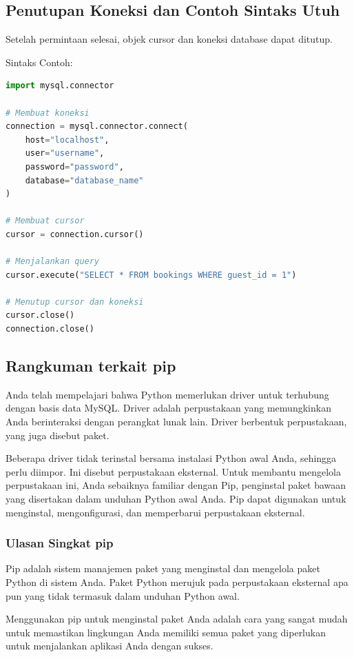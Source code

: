 \documentclass{article}
\begin{document}
\subsection{Penutupan Koneksi dan Contoh Sintaks Utuh}
Setelah permintaan selesai, objek cursor dan koneksi database dapat ditutup.

Sintaks Contoh:
\begin{lstlisting}[language=Python, caption={}, captionpos=b]
import mysql.connector

# Membuat koneksi
connection = mysql.connector.connect(
    host="localhost",
    user="username",
    password="password",
    database="database_name"
)

# Membuat cursor
cursor = connection.cursor()

# Menjalankan query
cursor.execute("SELECT * FROM bookings WHERE guest_id = 1")

# Menutup cursor dan koneksi
cursor.close()
connection.close()
\end{lstlisting}

\subsection{Rangkuman terkait pip}
Anda telah mempelajari bahwa Python memerlukan driver untuk terhubung dengan basis data MySQL. Driver adalah perpustakaan yang memungkinkan Anda berinteraksi dengan perangkat lunak lain. Driver berbentuk perpustakaan, yang juga disebut paket.

Beberapa driver tidak terinstal bersama instalasi Python awal Anda, sehingga perlu diimpor. Ini disebut perpustakaan eksternal. Untuk membantu mengelola perpustakaan ini, Anda sebaiknya familiar dengan Pip, penginstal paket bawaan yang disertakan dalam unduhan Python awal Anda. Pip dapat digunakan untuk menginstal, mengonfigurasi, dan memperbarui perpustakaan eksternal.

\subsubsection{Ulasan Singkat pip}
Pip adalah sistem manajemen paket yang menginstal dan mengelola paket Python di sistem Anda. Paket Python merujuk pada perpustakaan eksternal apa pun yang tidak termasuk dalam unduhan Python awal.

Menggunakan pip untuk menginstal paket Anda adalah cara yang sangat mudah untuk memastikan lingkungan Anda memiliki semua paket yang diperlukan untuk menjalankan aplikasi Anda dengan sukses.
\end{document}
